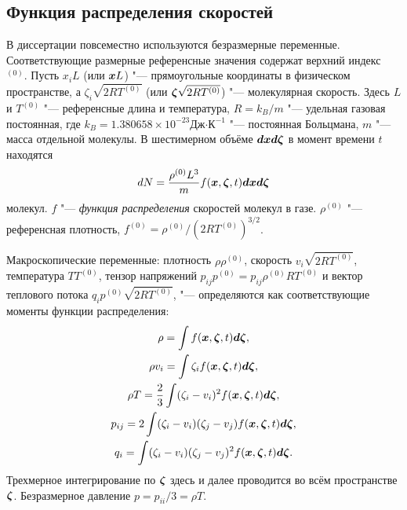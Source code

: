 
\subsection{Функция распределения скоростей}

В диссертации повсеместно используются безразмерные переменные.
Соответствующие размерные референсные значения содержат верхний индекс \({}^{(0)}\).
Пусть \(x_iL\) (или \({\boldsymbol{x}} L\)) "--- прямоугольные координаты в физическом пространстве,
а \(\zeta_i\sqrt{2RT^{(0)}}\) (или \({\boldsymbol{\zeta}}\sqrt{2RT^{(0)}}\)) "--- молекулярная скорость.
Здесь \(L\) и \(T^{(0)}\) "--- референсные длина и температура, \(R = k_B/m\) "--- удельная газовая постоянная,
где \(k_B=1.380658\times 10^{-23} \text{Дж·К}^{-1}\) "--- постоянная Больцмана,
\(m\) "--- масса отдельной молекулы.
В шестимерном объёме \(\boldsymbol{d{x}}\boldsymbol{d\zeta}\) в момент времени \(t\) находятся
\begin{equation}\label{eq:distrib_function}
    d{N} = \frac{\rho^{(0)}L^3}{m} f({\boldsymbol{x}},{\boldsymbol{\zeta}},t)\boldsymbol{d{x}}\boldsymbol{d\zeta}
\end{equation}
молекул. \(f\) "--- \emph{функция распределения} скоростей молекул в газе.
\(\rho^{(0)}\) "--- референсная плотность, \(f^{(0)} = \rho^{(0)}/(2RT^{(0)})^{3/2}\).

Макроскопические переменные: плотность \(\rho\rho^{(0)}\), скорость \(v_i\sqrt{2RT^{(0)}}\),
температура \(TT^{(0)}\), тензор напряжений \(p_{ij}p^{(0)} = p_{ij}\rho^{(0)}RT^{(0)}\)
и вектор теплового потока \(q_i p^{(0)}\sqrt{2RT^{(0)}}\), "--- определяются
как соответствующие моменты функции распределения:
\begin{gather}\label{eq:macro_variables}
    \rho = \int f({\boldsymbol{x}},{\boldsymbol{\zeta}},t)\boldsymbol{d\zeta}, \\
    \rho v_i = \int \zeta_i f({\boldsymbol{x}},{\boldsymbol{\zeta}},t)\boldsymbol{d\zeta}, \\
    \rho T = \frac23 \int (\zeta_i-v_i)^2 f({\boldsymbol{x}},{\boldsymbol{\zeta}},t)\boldsymbol{d\zeta}, \\
    p_{ij} = 2\int (\zeta_i-v_i)(\zeta_j-v_j) f({\boldsymbol{x}},{\boldsymbol{\zeta}},t)\boldsymbol{d\zeta}, \\
    q_i = \int (\zeta_i-v_i)(\zeta_j-v_j)^2 f({\boldsymbol{x}},{\boldsymbol{\zeta}},t)\boldsymbol{d\zeta}.
\end{gather}
Трехмерное интегрирование по \({\boldsymbol{\zeta}}\) здесь и далее проводится во всём пространстве \({\boldsymbol{\zeta}}\).
Безразмерное давление \(p = p_{ii}/3 = \rho T\).

